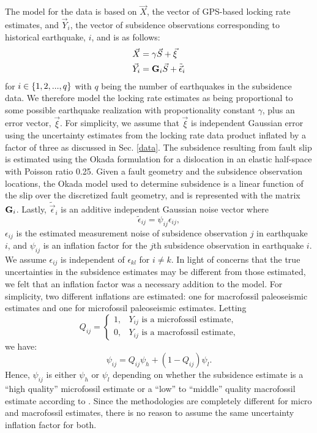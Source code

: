 {The model for the data is based on $\vec{X}$, the vector of GPS-based locking rate estimates, and $\vec{Y}_i$, the vector of subsidence observations corresponding to historical earthquake, $i$, and is as follows:
\begin{align}
\vec{X} &= \gamma \vec{S} + \vec{\xi}  \label{gpsDat} \\
\vec{Y}_i &= \mathbf{G}_i \vec{S} + \tilde{\vec{\epsilon}}_i \label{subDat}
\end{align}
for $i \in \left\{1,2,...,q\right\}$ with $q$ being the number of earthquakes in the subsidence data.  We therefore model the locking rate estimates as being proportional to some possible earthquake realization with proportionality constant $\gamma$, plus an error vector, $\vec{\xi}$.  For simplicity, we assume that $\vec{\xi}$ is independent Gaussian error using the uncertainty estimates from the locking rate data product inflated by a factor of three as discussed in Sec. \ref{data}.  The subsidence resulting from fault slip is estimated using the Okada formulation \citep{okada} for a dislocation in an elastic half-space with Poisson ratio 0.25.  Given a fault geometry and the subsidence observation locations, the Okada model used to determine subsidence is a linear function of the slip over the discretized fault geometry, and is represented with the matrix $\mathbf{G}_i$. Lastly, $\tilde{\vec{\epsilon}}_i$ is an additive independent Gaussian noise vector where 
$$ \tilde{\epsilon}_{ij} = \psi_{ij} \epsilon_{ij}, $$
$\epsilon_{ij}$ is the estimated measurement noise of subsidence observation $j$ in earthquake $i$, and $\psi_{ij}$ is an inflation factor for the $j$th subsidence observation in earthquake $i$.  We assume $\epsilon_{ij}$ is independent of $\epsilon_{kl}$ for $i \neq k$.  In light of concerns that the true uncertainties in the subsidence estimates may be different from those estimated, we felt that an inflation factor was a necessary addition to the model.  For simplicity, two different inflations are estimated: one for macrofossil paleoseismic estimates and one for microfossil paleoseismic estimates.  Letting 
$$ Q_{ij} = \begin{cases}
1, & \text{$Y_{ij}$ is a microfossil estimate,} \\
0, & \text{$Y_{ij}$ is a macrofossil estimate,}
\end{cases} $$
we have:
$$ \psi_{ij} = Q_{ij} \psi_h + (1-Q_{ij}) \psi_l. $$
Hence, $\psi_{ij}$ is either $\psi_h$ or $\psi_l$ depending on whether the subsidence estimate is a ``high quality'' microfossil estimate or a ``low'' to ``middle'' quality macrofossil estimate according to \citet{leonard2010}.  Since the methodologies are completely different for micro and macrofossil estimates, there is no reason to assume the same uncertainty inflation factor for both.

}
